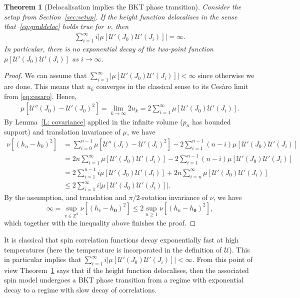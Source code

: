 \documentclass[11pt, reqno]{amsart}
\newtheorem{theorem}{Theorem}[section]
\numberwithin{equation}{section}
\theoremstyle{definition}
\theoremstyle{remark}
\newcommand{\J}{J}
\begin{document}
\begin{theorem}[Delocalisation implies the BKT phase transition] \label{thm:BKT}
Consider the setup from Section~\ref{sec:setup}.
	If the height function delocalises in the sense that~\eqref{eq:graddeloc} holds true for~$\nu$, then
	\begin{align*}
		\sum_{i=1}^\infty  i |\mu [\mathcal U'(\J_0)\mathcal U'(\J_i)]|= \infty. %
	\end{align*}
	In particular, there is no exponential decay of the two-point function $\mu [\mathcal U'(\J_0)\mathcal U'(\J_i)]$ as $i\to \infty$.%
\end{theorem}
\begin{proof}
	We can assume that $\sum_{i=1}^\infty |\mu [\mathcal U'(\J_0)\mathcal U'(\J_i)]|<\infty$ since otherwise we are done. This means that $u_k$ converges in the classical sense to its Ces\`aro limit
	from \eqref{eq:cesaro}. Hence, 
	\begin{align} \label{eq:exid}
		\mu[\mathcal U''(\J_0)-\mathcal U'(\J_0)^2] = \lim_{k\to \infty}2 u_k = 2\sum_{i=1}^\infty  \mu [\mathcal U'(\J_0)\mathcal U'(\J_i)].
	\end{align}
	By Lemma~\ref{L: covariance} applied in the infinite volume ($p_n$ has bounded support) and translation invariance of $\mu$, we have
	\begin{align*}
		\nu[(h_{n}-h_{ 0})^2] & =\sum_{i=0}^{n-1}\mu[\mathcal U''(\J_i)-\mathcal U'(\J_i)^2] -2\sum_{i=1}^{n-1} (n-i) \mu [\mathcal U'(\J_0)\mathcal U'(\J_i)] \\
		&= 2n \sum_{i=1}^\infty\mu [\mathcal U'(\J_0)\mathcal U'(\J_i)] -2\sum_{i=1}^{n-1} (n-i) \mu [\mathcal U'(\J_0)\mathcal U'(\J_i)]\\
		&= 2\sum_{i=1}^{n-1}i\mu [\mathcal U'(\J_0)\mathcal U'(\J_i)] +2n\sum_{i=n}^{\infty}  \mu [\mathcal U'(\J_0)\mathcal U'(\J_i)] \\
		&\leq 2 \sum_{i=1}^\infty  i |\mu [\mathcal U'(\J_0)\mathcal U'(\J_i)]|.
	\end{align*}
	By the assumption, and translation and $\pi/2$-rotation invariance of $\mathcal \nu$, we have
	\[
\infty =\sup_{v\in \mathbb Z^2} \nu[(h_{v}-h_{\mathbf 0})^2]\leq 2 \sup_{n\geq 1} \nu[(h_{n}-h_{\mathbf 0})^2],
	\]
which together with the inequality above finishes the proof.
\end{proof}

It is classical that spin correlation functions decay exponentially fast at high temperatures (here the temperature is incorporated in the definition of $\mathcal U$).
This in particular implies that $\sum_{i=1}^\infty i |\mu [\mathcal U'(\J_0)\mathcal U'(\J_i)]|<\infty$. 
From this point of view Theorem~\ref{thm:BKT} says that if the height function delocalises, then the associated
spin model undergoes a BKT phase transition from a regime with exponential decay to a regime with slow decay of correlations.
\end{document}
